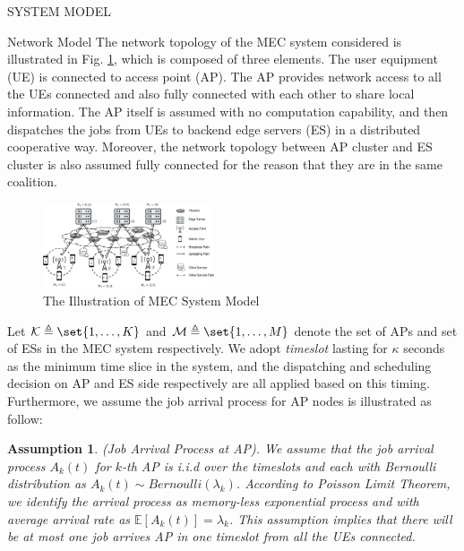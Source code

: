 \documentclass[10pt, conference, letterpaper]{IEEEtran}
\newtheorem{assumption}{Assumption}
\DeclarePairedDelimiter\set\{\}
\begin{document}
    \begin{section}{SYSTEM MODEL}
        \label{sec:model}
        \begin{subsection}{Network Model}
            The network topology of the MEC system considered is illustrated in Fig. \ref{fig:system}, which is composed of three elements. The user equipment (UE) is connected to access point (AP). The AP provides network access to all the UEs connected and also fully connected with each other to share local information. The AP itself is assumed with no computation capability, and then dispatches the jobs from UEs to backend edge servers (ES) in a distributed cooperative way. Moreover, the network topology between AP cluster and ES cluster is also assumed fully connected for the reason that they are in the same coalition.
            \begin{figure}[ht]
                \centering
                \includegraphics[width=0.45\textwidth, trim={0.5cm 0.5cm 0.5cm 0.5cm}, clip]{system-model.pdf}
                \caption{The Illustration of MEC System Model}
                \label{fig:system}
            \end{figure}

            Let $\mathcal{K} \triangleq \set{1,\dots,K}$ and $\mathcal{M} \triangleq \set{1,\dots,M}$ denote the set of APs and set of ESs in the MEC system respectively. We adopt \emph{timeslot} lasting for $\kappa$ seconds as the minimum time slice in the system, and the dispatching and scheduling decision on AP and ES side respectively are all applied based on this timing. Furthermore, we assume the job arrival process for AP nodes is illustrated as follow:
            \begin{assumption}
                (Job Arrival Process at AP).
                We assume that the job arrival process $A_k(t)$ for $k$-th AP is i.i.d over the timeslots and each with Bernoulli distribution as $A_k(t) \sim Bernoulli(\lambda_k)$.  According to Poisson Limit Theorem, we identify the arrival process as memory-less exponential process and with average arrival rate as $\mathbb{E}[A_k(t)] = \lambda_k$.
                This assumption implies that there will be at most one job arrives AP in one timeslot from all the UEs connected.
            \end{assumption}


\end{subsection}
\end{section}
\end{document}
